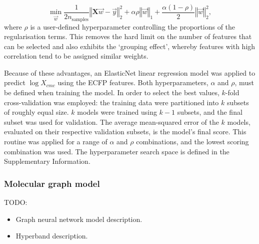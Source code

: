 \begin{equation}
    \label{eq:elastic}
    \min_{\vec{w}} { \frac{1}{2n_{\text{samples}}} \left \Vert \mathbf{X}\vec{w} - \vec{y} \right \Vert_2 ^ 2 + \alpha\rho \left \Vert \vec{w} \right \Vert_1} + \frac{\alpha(1 - \rho)}{2} \left \Vert \vec{w} \right \Vert_2^2,
\end{equation}
where $\rho$ is a user-defined hyperparameter controlling the proportions of the
regularisation terms. This removes the hard limit on the number of features that can be
selected and also exhibits the `grouping effect', whereby features with high correlation
tend to be assigned similar weights.

Because of these advantages, an ElasticNet linear regression model was applied
to predict $\log X_{cmc}$ using the ECFP features. Both hyperparameters,
$\alpha$ and $\rho$, must be defined when training the model. In order to select
the best values, $k$-fold cross-validation was employed: the training data were
partitioned into $k$ subsets of roughly equal size. $k$ models were trained
using $k-1$ subsets, and the final subset was used for validation. The average
mean-squared error of the $k$ models, evaluated on their respective validation
subsets, is the model's final score. This routine was applied for a range of
$\alpha$ and $\rho$ combinations, and the lowest scoring combination was used.
The hyperparameter search space is defined in the Supplementary Information.

\subsubsection{Molecular graph model}

TODO:
\begin{itemize}
    \item Graph neural network model description.
    \item Hyperband description.
\end{itemize}